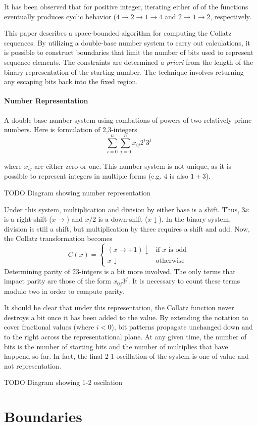 \documentclass{article}
\begin{document}
It has been observed that for positive integer, iterating either of of the functions
eventually produces cyclic behavior ($4\rightarrow 2\rightarrow 1\rightarrow 4$ and
$2\rightarrow1\rightarrow2$, respectively.

This paper describes a space-bounded algorithm for computing the Collatz
sequences.  By utilizing a double-base number system to carry out calculations,
it is possible to construct boundaries that limit the number of bits used to
represent sequence elements.  The constraints are determined \emph{a priori}
from the length of the binary representation of the starting number. The technique
involves returning any escaping bits back into the fixed region.

\paragraph{Number Representation}

A double-base number system using combations of powers of two relatively prime numbers.
Here is formulation of {2,3}-integers
\begin{equation}
  \sum_{i=0}^n \sum_{j=0}^n x_{ij} 2^i3^j
\end{equation}

where $x_{ij}$ are either zero or one. This number system is not unique, as it is possible
to represent integers in multiple forms (e.g. $4$ is also $1 + 3$).

TODO Diagram showing number representation

Under this system, multiplication and division by either base is a shift. Thus, $3x$ is a
right-shift ($x\rightarrow$) and $x/2$ is a down-shift ($x\downarrow$). In the binary system,
division is still a shift, but multiplication by three requires a shift and add. Now, the
Collatz transformation becomes
\begin{equation}
  C(x) = \begin{cases}
    (x\rightarrow + 1)\downarrow & \text{if } x \text{ is odd}\\
    x\downarrow & \text{otherwise}
    \end{cases}
\end{equation}
Determining parity of {23}-intgers is a bit more involved. The only terms that impact
parity are those of the form $x_{0j}3^j$. It is necessary to count these terms modulo two
in order to compute parity.

It should be clear that under this representation, the Collatz function never
destroys a bit once it has been added to the value. By extending the notation
to cover fractional values (where $i<0$), bit patterns propagate unchanged down
and to the right across the representational plane.  At any given time, the
number of bits is the number of starting bits and the number of multiplies that
have happend so far. In fact, the final $2$-$1$ oscillation of the system is
one of value and not representation.

TODO Diagram showing 1-2 oscilation

\section{Boundaries}





\end{document}
